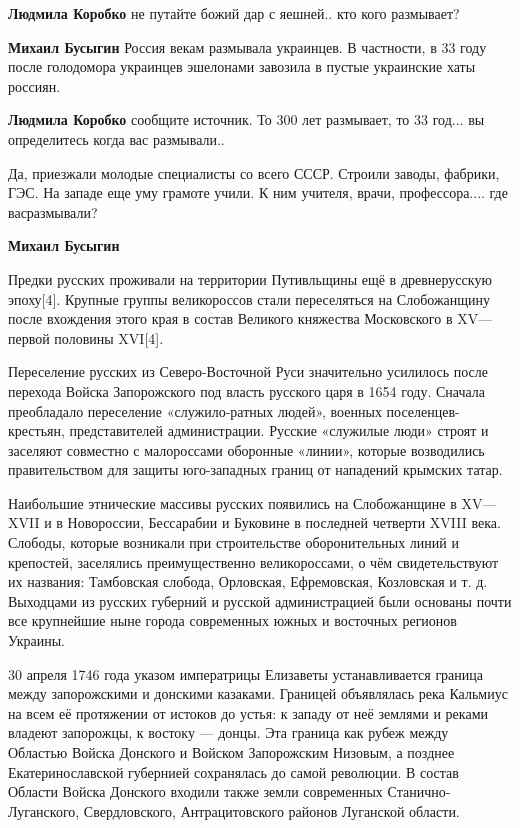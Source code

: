 \begin{itemize}
{\begin{itemize}
\textbf{Людмила Коробко} не путайте божий дар с яешней.. кто кого размывает?

\textbf{Михаил Бусыгин} Россия векам размывала украинцев. В частности, в 33 году после голодомора украинцев эшелонами завозила в пустые украинские хаты россиян.

\textbf{Людмила Коробко} сообщите источник. То 300 лет размывает, то 33 год... вы определитесь когда вас размывали..

Да, приезжали молодые специалисты со всего СССР. Строили заводы, фабрики, ГЭС.
На западе еще уму грамоте учили. К ним учителя, врачи, профессора.... где
васразмывали?

\textbf{Михаил Бусыгин} 

Предки русских проживали на территории Путивльщины ещё в древнерусскую
эпоху[4]. Крупные группы великороссов стали переселяться на Слобожанщину после
вхождения этого края в состав Великого княжества Московского в XV—первой
половины XVI[4].

Переселение русских из Северо-Восточной Руси значительно усилилось после
перехода Войска Запорожского под власть русского царя в 1654 году. Сначала
преобладало переселение «служило-ратных людей», военных поселенцев-крестьян,
представителей администрации. Русские «служилые люди» строят и заселяют
совместно с малороссами оборонные «линии», которые возводились правительством
для защиты юго-западных границ от нападений крымских татар.

Наибольшие этнические массивы русских появились на Слобожанщине в XV—XVII и в
Новороссии, Бессарабии и Буковине в последней четверти XVIII века. Слободы,
которые возникали при строительстве оборонительных линий и крепостей,
заселялись преимущественно великороссами, о чём свидетельствуют их названия:
Тамбовская слобода, Орловская, Ефремовская, Козловская и т. д. Выходцами из
русских губерний и русской администрацией были основаны почти все крупнейшие
ныне города современных южных и восточных регионов Украины.

30 апреля 1746 года указом императрицы Елизаветы устанавливается граница между
запорожскими и донскими казаками. Границей объявлялась река Кальмиус на всем её
протяжении от истоков до устья: к западу от неё землями и реками владеют
запорожцы, к востоку — донцы. Эта граница как рубеж между Областью Войска
Донского и Войском Запорожским Низовым, а позднее Екатеринославской губернией
сохранялась до самой революции. В состав Области Войска Донского входили также
земли современных Станично-Луганского, Свердловского, Антрацитовского районов
Луганской области.


\end{itemize}}
\end{itemize}

